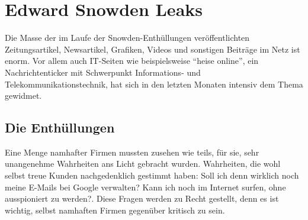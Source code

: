 \newpage
\section{Edward Snowden Leaks}
Die Masse der im Laufe der Snowden-Enthüllungen veröffentlichten Zeitungsartikel, Newsartikel, Grafiken, Videos und sonstigen Beiträge im Netz ist enorm.
Vor allem auch IT-Seiten wie beispielsweise ``heise online'', ein Nachrichtenticker mit Schwerpunkt Informations- und Telekommunikationstechnik, hat sich in den letzten Monaten intensiv dem Thema gewidmet.

\subsection{Die Enthüllungen}
Eine Menge namhafter Firmen mussten zusehen wie teils, für sie, sehr unangenehme Wahrheiten ans Licht gebracht wurden. Wahrheiten, die wohl selbst treue Kunden nachgedenklich gestimmt haben: Soll ich denn wirklich noch meine E-Mails bei Google verwalten? Kann ich noch im Internet surfen, ohne ausspioniert zu werden?. Diese Fragen werden zu Recht gestellt, denn es ist wichtig, selbst namhaften Firmen gegenüber kritisch zu sein.

